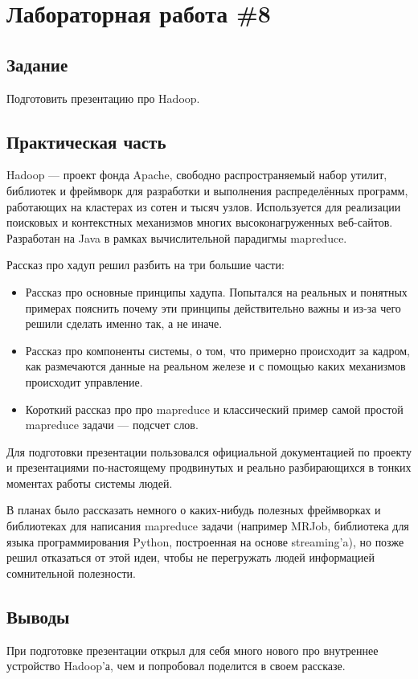 \documentclass[14pt, a4paper]{extreport}
\begin{document}
\section*{Лабораторная работа \#8}
\subsection*{Задание}
Подготовить презентацию про Hadoop.
\subsection*{Практическая часть}
Hadoop --- проект фонда Apache, свободно распространяемый набор утилит, библиотек и фреймворк для разработки
и выполнения распределённых программ, работающих на кластерах из сотен и тысяч узлов.
Используется для реализации поисковых и контекстных механизмов многих высоконагруженных веб-сайтов.
Разработан на Java в рамках вычислительной парадигмы mapreduce. 

Рассказ про хадуп решил разбить на три большие части:
\begin{itemize}
\item Рассказ про основные принципы хадупа. Попытался на реальных и понятных
  примерах пояснить почему эти принципы действительно важны и из-за чего решили
  сделать именно так, а не иначе.
\item Рассказ про компоненты системы, о том, что примерно происходит за кадром,
  как размечаются данные на реальном железе и с помощью каких механизмов происходит
  управление.
\item Короткий рассказ про про mapreduce и классический пример самой простой
  mapreduce задачи --- подсчет слов.
\end{itemize}

Для подготовки презентации пользовался официальной документацией по проекту и
презентациями по-настоящему продвинутых и реально разбирающихся в тонких моментах
работы системы людей.

В планах было рассказать немного о каких-нибудь полезных фреймворках и библиотеках
для написания mapreduce задачи (например MRJob, библиотека для языка программирования
Python, построенная на основе streaming'a), но позже решил отказаться от этой идеи, чтобы
не перегружать людей информацией сомнительной полезности.

\subsection*{Выводы}
При подготовке презентации открыл для себя много нового про внутреннее устройство
Hadoop'а, чем и попробовал поделится в своем рассказе.
\end{document}
